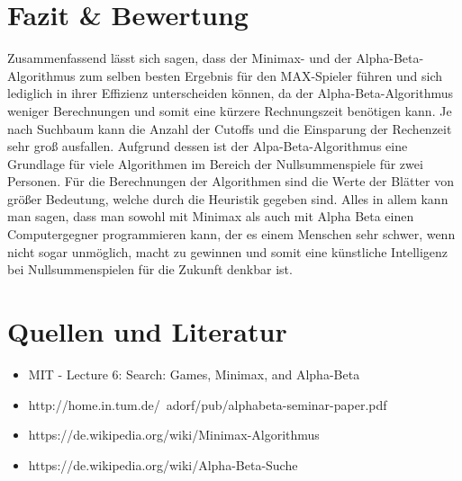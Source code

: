 \section{Fazit \& Bewertung}

Zusammenfassend lässt sich sagen, dass der Minimax- und der Alpha-Beta-Algorithmus zum selben besten Ergebnis für den MAX-Spieler führen und sich lediglich in ihrer Effizienz unterscheiden können, da der Alpha-Beta-Algorithmus weniger Berechnungen und somit eine kürzere Rechnungszeit benötigen kann. Je nach Suchbaum kann die Anzahl der Cutoffs und die Einsparung der Rechenzeit sehr groß ausfallen. Aufgrund dessen ist der Alpa-Beta-Algorithmus eine Grundlage für viele Algorithmen im Bereich der Nullsummenspiele für zwei Personen. Für die Berechnungen der Algorithmen sind die Werte der Blätter von größer Bedeutung, welche durch die Heuristik gegeben sind. Alles in allem kann man sagen, dass man sowohl mit Minimax als auch mit Alpha Beta einen Computergegner programmieren kann, der es einem Menschen sehr schwer, wenn nicht sogar unmöglich, macht zu gewinnen und somit eine künstliche Intelligenz bei Nullsummenspielen für die Zukunft denkbar ist.


\section{Quellen und Literatur}

\begin{itemize}
\item MIT - Lecture 6: Search: Games, Minimax, and Alpha-Beta
\item http://home.in.tum.de/~adorf/pub/alphabeta-seminar-paper.pdf
\item https://de.wikipedia.org/wiki/Minimax-Algorithmus
\item https://de.wikipedia.org/wiki/Alpha-Beta-Suche
\end{itemize}
